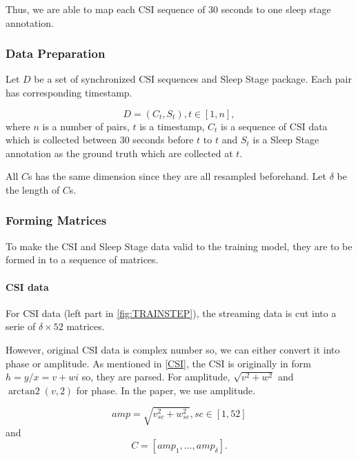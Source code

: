 \documentclass[10pt,letterpaper]{article}
\DeclareMathOperator{\arctantwo}{arctan2}
\begin{document}
	Thus, we are able to map each CSI sequence of 30 seconds to one sleep stage annotation.		
	
	

	\subsubsection*{Data Preparation}
	Let $D$ be a set of synchronized CSI sequences and Sleep Stage package. Each pair has corresponding timestamp.
	
	
	
	\begin{equation}
	D =  {(C_t, S_t), t \in [1, n]},
	\label{eq:Dataset}
	\end{equation} where  $n$ is a number of pairs, $t$ is a timestamp, $C_t$ is a sequence of CSI data which is collected between 30 seconds before $t$ to $t$ and $S_t$ is a Sleep Stage annotation as the ground truth which are collected at $t$.

	All $C$s has the same dimension since they are all resampled  beforehand. Let $\delta$ be the length of $C$s.

	
	\subsubsection*{Forming Matrices}
	To make the CSI and Sleep Stage data valid to the training model, they are to be formed in to a sequence of matrices.
	
	\paragraph{CSI data}
	For CSI data (left part in \ref{fig:TRAINSTEP}), the streaming data is cut into a serie of $\delta \times 52$ matrices.
	
	However, original CSI data is complex number so, we can either convert it into phase or amplitude. As mentioned in \ref{CSI}, the CSI is originally in form $h=y/x=v+wi$ so, they are parsed. For amplitude,  $\sqrt{ v^2+w^2 }$ and $\arctantwo(v, 2 )$ for phase.
	In the paper, we use amplitude.
	
		\begin{equation}
		amp =  {  \sqrt{ v_{sc}^2+w_{sc}^2 } , sc \in [1, 52]}
		\label{eq:CSIampParser}
	\end{equation}
and
\begin{equation}
	C =  [amp_1,...,amp_{\delta}].
	\label{eq:CSIseq}
\end{equation}
\end{document}
